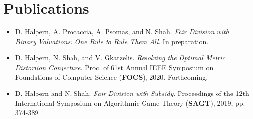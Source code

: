 \documentclass{article}
\begin{document}
    \section{Publications}
    \begin{itemize}
        \setlength\itemsep{3ex}
        \item D. Halpern, A. Procaccia, A. Psomas, and N. Shah. \textit{Fair Division with Binary Valuations: One
        Rule to Rule
        Them All}. In preparation.

        \item D. Halpern, N. Shah, and V. Gkatzelis. \textit{Resolving the Optimal Metric Distortion Conjecture}.
        Proc. of
        61st Annual IEEE Symposium on Foundations of Computer Science (\textbf{FOCS}), 2020. Forthcoming.

        \item D. Halpern and N. Shah. \textit{Fair Division with Subsidy}. Proceedings of the 12th International Symposium on
        Algorithmic Game Theory (\textbf{SAGT}), 2019, pp. 374-389

    \end{itemize}
\end{document}
